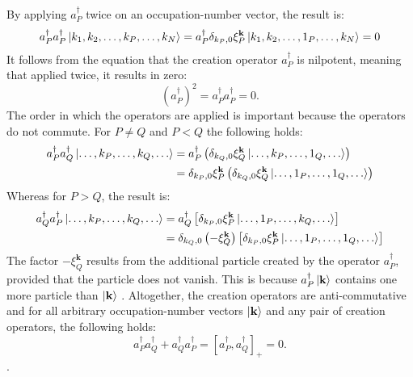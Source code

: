 By applying $a_P^{\dagger}$ twice on an occupation-number vector, the result is:
\begin{align}
    a_P^{\dagger} a_P^{\dagger} \ket{k_1, k_2, \ldots, k_P, \ldots, k_N} = a_P^{\dagger} \delta_{k_P, 0} \xi_P^{\mathbf{k}} \ket{k_1, k_2, \ldots, 1_P, \ldots, k_N} = 0
\end{align}
It follows from the equation that the creation operator $a_P^{\dagger}$ is nilpotent, meaning that applied twice, it results in zero:
\begin{equation}
    (a_P^{\dagger})^2 = a_P^{\dagger} a_P^{\dagger} = 0.
\end{equation}
The order in which the operators are applied is important because the operators do not commute. 
For $P \neq Q$ and $P < Q$ the following holds:
\begin{equation}
    \begin{split}
        a_P^{\dagger} a_Q^{\dagger} \ket{\ldots, k_P, \ldots, k_Q, \ldots} &= a_P^{\dagger} \left ( \delta_{k_Q, 0} \xi_Q^{\mathbf{k}} \ket{\ldots, k_P, \ldots, 1_Q, \ldots} \right ) \\ 
        &= \delta_{k_P, 0} \xi_P^{\mathbf{k}} \left (  \delta_{k_Q, 0} \xi_Q^{\mathbf{k}} \ket{\ldots, 1_P, \ldots, 1_Q, \ldots} \right )
    \end{split}
\end{equation}
Whereas for $P > Q$, the result is:
\begin{equation}
    \begin{split}
        a_Q^{\dagger} a_P^{\dagger} \ket{\ldots, k_P, \ldots, k_Q, \ldots} &= a_Q^{\dagger} \left [ \delta_{k_P, 0} \xi_P^{\mathbf{k}} \ket{\ldots, 1_P, \ldots, k_Q, \ldots} \right ] \\ 
        &= \delta_{k_Q, 0} \left (-\xi_Q^{\mathbf{k}}\right ) \left [  \delta_{k_P, 0} \xi_P^{\mathbf{k}} \ket{\ldots, 1_P, \ldots, 1_Q, \ldots} \right ]
    \end{split}
\end{equation}
The factor $-\xi_Q^{\mathbf{k}}$ results from the additional particle created by the operator $a_P^{\dagger}$, provided that the particle does not vanish. This is because $a_P^{\dagger}\ket{\textbf{k}}$ contains one more particle than $\ket{\textbf{k}}$ \cite{Helgaker2000}.
Altogether, the creation operators are anti-commutative and for all arbitrary occupation-number vectors $\ket{\textbf{k}}$ and any pair of creation operators, the following holds:
\begin{equation}
    a_P^{\dagger} a_Q^{\dagger} + a_Q^{\dagger} a_P^{\dagger} = \left [ a_P^{\dagger}, a_Q^{\dagger} \right ]_+ = 0. \label{eq: anti_commutator}
\end{equation}
\cite{Altland, Helgaker2000}.

